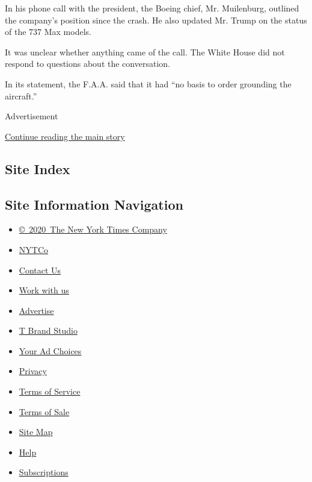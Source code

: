 In his phone call with the president, the Boeing chief, Mr. Muilenburg,
outlined the company's position since the crash. He also updated Mr.
Trump on the status of the 737 Max models.

It was unclear whether anything came of the call. The White House did
not respond to questions about the conversation.

In its statement, the F.A.A. said that it had ``no basis to order
grounding the aircraft.''

Advertisement

\protect\hyperlink{after-bottom}{Continue reading the main story}

\hypertarget{site-index}{%
\subsection{Site Index}\label{site-index}}

\hypertarget{site-information-navigation}{%
\subsection{Site Information
Navigation}\label{site-information-navigation}}

\begin{itemize}
\tightlist
\item
  \href{https://help.nytimes.com/hc/en-us/articles/115014792127-Copyright-notice}{©~2020~The
  New York Times Company}
\end{itemize}

\begin{itemize}
\tightlist
\item
  \href{https://www.nytco.com/}{NYTCo}
\item
  \href{https://help.nytimes.com/hc/en-us/articles/115015385887-Contact-Us}{Contact
  Us}
\item
  \href{https://www.nytco.com/careers/}{Work with us}
\item
  \href{https://nytmediakit.com/}{Advertise}
\item
  \href{http://www.tbrandstudio.com/}{T Brand Studio}
\item
  \href{https://www.nytimes.com/privacy/cookie-policy\#how-do-i-manage-trackers}{Your
  Ad Choices}
\item
  \href{https://www.nytimes.com/privacy}{Privacy}
\item
  \href{https://help.nytimes.com/hc/en-us/articles/115014893428-Terms-of-service}{Terms
  of Service}
\item
  \href{https://help.nytimes.com/hc/en-us/articles/115014893968-Terms-of-sale}{Terms
  of Sale}
\item
  \href{https://spiderbites.nytimes.com}{Site Map}
\item
  \href{https://help.nytimes.com/hc/en-us}{Help}
\item
  \href{https://www.nytimes.com/subscription?campaignId=37WXW}{Subscriptions}
\end{itemize}
